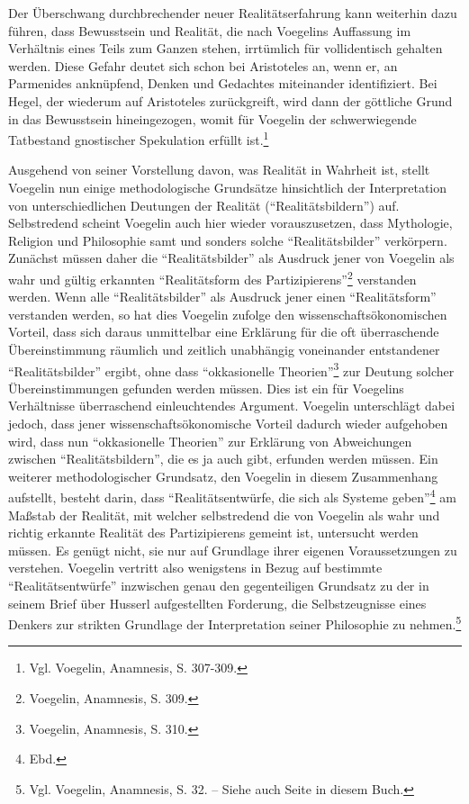 Der Überschwang durchbrechender neuer Realitätserfahrung kann weiterhin dazu
führen, dass Bewusstsein und Realität, die nach Voegelins Auffassung im
Verhältnis eines Teils zum Ganzen stehen, irrtümlich für vollidentisch gehalten
werden. Diese Gefahr deutet sich schon bei Aristoteles an, wenn er, an
Parmenides anknüpfend, Denken und Gedachtes miteinander identifiziert. Bei
Hegel, der wiederum auf Aristoteles zurückgreift, wird dann der göttliche
Grund in das Bewusstsein hineingezogen, womit für Voegelin der schwerwiegende
Tatbestand gnostischer Spekulation erfüllt ist.\footnote{Vgl. Voegelin,
  Anamnesis, S. 307-309.}
 
Ausgehend von seiner Vorstellung davon, was Realität in Wahrheit ist, stellt
Voegelin nun einige methodologische Grundsätze hinsichtlich der Interpretation
von unterschiedlichen Deutungen der Realität ("`Realitätsbildern"') auf.
Selbstredend scheint Voegelin auch hier wieder vorauszusetzen, dass
Mythologie, Religion und Philosophie samt und sonders solche
"`Realitätsbilder"' verkörpern. Zunächst müssen daher die "`Realitätsbilder"'
als Ausdruck jener von Voegelin als wahr und gültig erkannten "`Realitätsform
des Partizipierens"'\footnote{Voegelin, Anamnesis, S. 309.} verstanden werden.
Wenn alle "`Realitätsbilder"' als Ausdruck jener einen "`Realitätsform"'
verstanden werden, so hat dies Voegelin zufolge den wissenschaftsökonomischen
Vorteil, dass sich daraus unmittelbar eine Erklärung für die oft überraschende
Übereinstimmung räumlich und zeitlich unabhängig voneinander entstandener
"`Realitätsbilder"' ergibt, ohne dass "`okkasionelle
Theorien"'\footnote{Voegelin, Anamnesis, S. 310.} zur Deutung solcher
Übereinstimmungen gefunden werden müssen. Dies ist ein für Voegelins
Verhältnisse überraschend einleuchtendes Argument. Voegelin unterschlägt dabei
jedoch, dass jener wissenschaftsökonomische Vorteil dadurch wieder aufgehoben
wird, dass nun "`okkasionelle Theorien"' zur Erklärung von Abweichungen
zwischen "`Realitätsbildern"', die es ja auch gibt, erfunden werden müssen.
\label{Selbstzeugnisse2} Ein weiterer methodologischer Grundsatz, den Voegelin
in diesem Zusammenhang aufstellt, besteht darin, dass "`Realitätsentwürfe, die
sich als Systeme geben"'\footnote{Ebd.} am Maßstab der Realität, mit welcher
selbstredend die von Voegelin als wahr und richtig erkannte Realität des
Partizipierens gemeint ist, untersucht werden müssen. Es genügt nicht, sie nur
auf Grundlage ihrer eigenen Voraussetzungen zu verstehen. Voegelin vertritt
also wenigstens in Bezug auf bestimmte "`Realitätsentwürfe"' inzwischen genau
den gegenteiligen Grundsatz zu der in seinem Brief über Husserl aufgestellten
Forderung, die Selbstzeugnisse eines Denkers zur strikten Grundlage der
Interpretation seiner Philosophie zu nehmen.\footnote{Vgl. Voegelin,
  Anamnesis, S. 32. -- Siehe auch Seite \pageref{Selbstzeugnisse1} in diesem
  Buch.}
 
